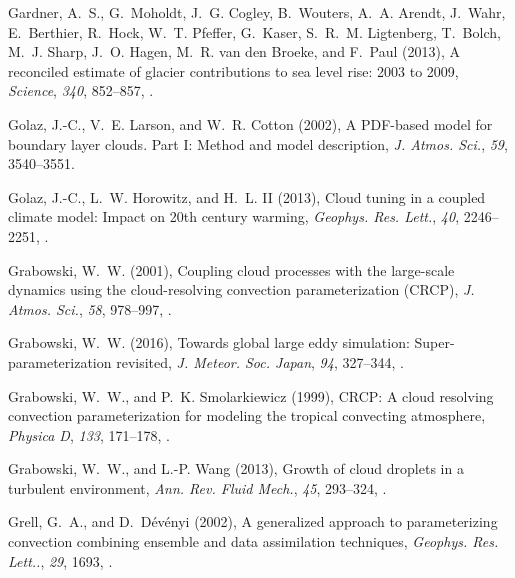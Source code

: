 \documentclass[draft]{agujournal}
\begin{document}
\begin{thebibliography}{196}
Gardner, A.~S., G.~Moholdt, J.~G. Cogley, B.~Wouters, A.~A. Arendt, J.~Wahr,
  E.~Berthier, R.~Hock, W.~T. Pfeffer, G.~Kaser, S.~R.~M. Ligtenberg, T.~Bolch,
  M.~J. Sharp, J.~O. Hagen, M.~R. {van den Broeke}, and F.~Paul (2013), A
  reconciled estimate of glacier contributions to sea level rise: 2003 to 2009,
  \textit{Science}, \textit{340}, 852--857, .

Golaz, J.-C., V.~E. Larson, and W.~R. Cotton (2002), A {PDF}-based model for
  boundary layer clouds. {Part I}: Method and model description, \textit{J.
  Atmos. Sci.}, \textit{59}, 3540--3551.

Golaz, J.-C., L.~W. Horowitz, and H.~L. {II} (2013), Cloud tuning in a coupled
  climate model: Impact on 20th century warming, \textit{Geophys. Res. Lett.},
  \textit{40}, 2246--2251, .

Grabowski, W.~W. (2001), Coupling cloud processes with the large-scale dynamics
  using the cloud-resolving convection parameterization ({CRCP}), \textit{J.
  Atmos. Sci.}, \textit{58}, 978--997,
  .

Grabowski, W.~W. (2016), Towards global large eddy simulation:
  Super-parameterization revisited, \textit{J. Meteor. Soc. Japan},
  \textit{94}, 327--344, .

Grabowski, W.~W., and P.~K. Smolarkiewicz (1999), {CRCP}: A cloud resolving
  convection parameterization for modeling the tropical convecting atmosphere,
  \textit{Physica D}, \textit{133}, 171--178,
  .

Grabowski, W.~W., and L.-P. Wang (2013), Growth of cloud droplets in a
  turbulent environment, \textit{Ann. Rev. Fluid Mech.}, \textit{45}, 293--324,
  .

Grell, G.~A., and D.~D{\'e}v{\'e}nyi (2002), A generalized approach to
  parameterizing convection combining ensemble and data assimilation
  techniques, \textit{Geophys. Res. Lett..}, \textit{29}, 1693,
  .


\end{thebibliography}
\end{document}
